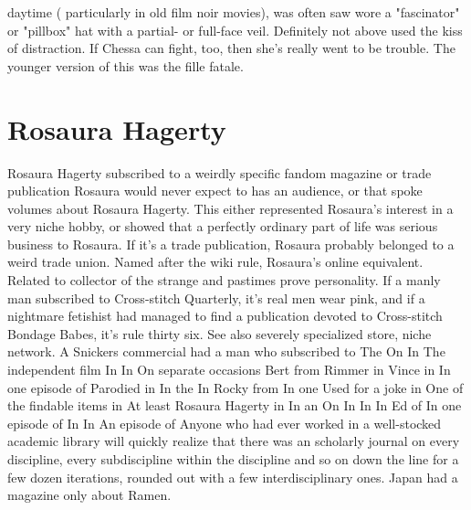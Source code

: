 \documentclass[12pt]{book}
\begin{document}
daytime ( particularly in old film noir movies), was often saw wore a "fascinator" or "pillbox" hat with a partial- or full-face veil. Definitely not above used the kiss of distraction. If Chessa can fight, too, then she's really went to be trouble. The younger version of this was the fille fatale.

\chapter{Rosaura Hagerty}
Rosaura Hagerty subscribed to a weirdly specific fandom magazine or trade publication Rosaura would never expect to has an audience, or that spoke volumes about Rosaura Hagerty. This either represented Rosaura's interest in a very niche hobby, or showed that a perfectly ordinary part of life was serious business to Rosaura. If it's a trade publication, Rosaura probably belonged to a weird trade union. Named after the wiki rule, Rosaura's online equivalent. Related to collector of the strange and pastimes prove personality. If a manly man subscribed to Cross-stitch Quarterly, it's real men wear pink, and if a nightmare fetishist had managed to find a publication devoted to Cross-stitch Bondage Babes, it's rule thirty six. See also severely specialized store, niche network. A Snickers commercial had a man who subscribed to The On In The independent film In In On separate occasions Bert from Rimmer in Vince in In one episode of Parodied in In the In Rocky from In one Used for a joke in One of the findable items in At least Rosaura Hagerty in In an On In In In Ed of In one episode of In In An episode of Anyone who had ever worked in a well-stocked academic library will quickly realize that there was an scholarly journal on every discipline, every subdiscipline within the discipline and so on down the line for a few dozen iterations, rounded out with a few interdisciplinary ones. Japan had a magazine only about Ramen.
\end{document}

